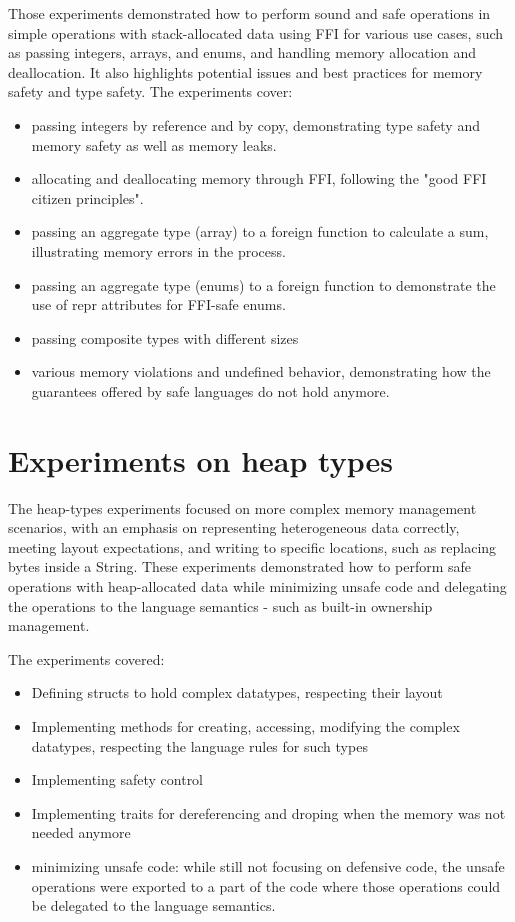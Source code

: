\documentclass[nomenclature, english, bibtex]{kththesis}
\begin{document}
Those experiments demonstrated how to perform sound and safe operations in simple operations with stack-allocated data using \gls{FFI} for various use cases, such as passing integers, arrays, and enums, and handling memory allocation and deallocation. It also highlights potential issues and best practices for memory safety and type safety. The experiments cover:

\begin{itemize}
    \item passing integers by reference and by copy, demonstrating type safety and memory safety as well as memory leaks.
    \item allocating and deallocating memory through FFI, following the "good FFI citizen principles".
    \item passing an aggregate type (array) to a foreign function to calculate a sum, illustrating memory errors in the process.
     \item passing an aggregate type (enums) to a foreign function to demonstrate the use of repr attributes for FFI-safe enums.
     \item passing composite types with different sizes
     \item various memory violations and undefined behavior, demonstrating how the guarantees offered by safe languages do not hold anymore.
\end{itemize}
 
\section{Experiments on heap types}
The heap-types experiments focused on more complex memory management scenarios, with an emphasis on representing heterogeneous data correctly, meeting layout expectations, and writing to specific locations, such as replacing bytes inside a String. These experiments demonstrated how to perform safe operations with heap-allocated data while minimizing unsafe code and delegating the operations to the language semantics - such as built-in ownership management.

The experiments covered:

\begin{itemize}
    \item Defining structs to hold complex datatypes, respecting their layout
    \item Implementing methods for creating, accessing, modifying the complex datatypes, respecting the language rules for such types
    \item Implementing safety control
    \item Implementing traits for dereferencing and droping when the memory was not needed anymore
    \item minimizing unsafe code: while still not focusing on defensive code, the unsafe operations were exported to a part of the code where those operations could be delegated to the language semantics.   
\end{itemize}
\end{document}
